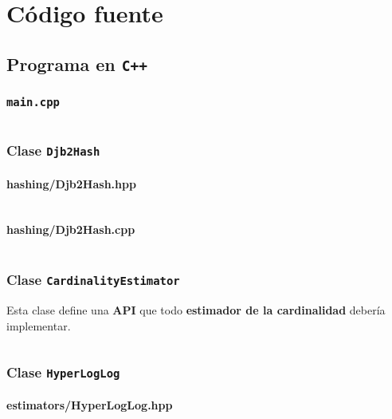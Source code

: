% 
\section{Código fuente}

\subsection{Programa en \texttt{C++}}
\label{codigo:programa}

\subsubsection{\texttt{main.cpp}}
\inputminted{cpp}{../src/main.cpp}

\subsubsection{Clase \texttt{Djb2Hash}}
\label{codigo:hash}

\paragraph{hashing/Djb2Hash.hpp}
\inputminted{cpp}{../src/hashing/Djb2Hash.hpp}

\paragraph{hashing/Djb2Hash.cpp}
\inputminted{cpp}{../src/hashing/Djb2Hash.cpp}

\subsubsection{Clase \texttt{CardinalityEstimator}}

Esta clase define una \textbf{API} que todo \textbf{estimador de la cardinalidad} debería implementar.

\inputminted{cpp}{../src/estimators/CardinalityEstimator.hpp}

\subsubsection{Clase \texttt{HyperLogLog}}
\label{codigo:hyperloglog}

\paragraph{estimators/HyperLogLog.hpp}
\inputminted{cpp}{../src/estimators/HyperLogLog.hpp}

